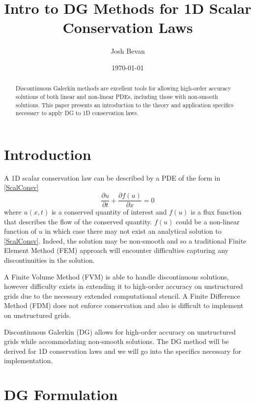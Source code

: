 \documentclass[letterpaper]{article}
\title{Intro to DG Methods for 1D Scalar Conservation Laws}
\author{Josh Bevan}
\date{\today}
\begin{document}
\maketitle
\begin{abstract}
Discontinuous Galerkin methods are excellent tools for allowing high-order accuracy solutions of both linear and non-linear PDEs, including those with non-smooth solutions. This paper presents an introduction to the theory and application specifics necessary to apply DG to 1D conservation laws.
\end{abstract}

\section{Introduction}
A 1D scalar conservation law can be described by a PDE of the form in \eqref{ScalConsv}
	\begin{equation}\label{ScalConsv}
	\frac{\partial u}{\partial t} + \frac{\partial f(u)}{\partial x} = 0
	\end{equation}
where $u(x,t)$ is a conserved quantity of interest and $f(u)$ is a flux function that describes the flow of the conserved quantity. $f(u)$ could be a non-linear function of $u$ in which case there may not exist an analytical solution to \eqref{ScalConsv}. Indeed, the solution may be non-smooth and so a traditional Finite Element Method (FEM) approach will encounter difficulties capturing any discontinuities in the solution.

A Finite Volume Method (FVM) is able to handle discontinuous solutions, however difficulty exists in extending it to high-order accuracy on unstructured grids due to the necessary extended computational stencil. A Finite Difference Method (FDM) does not enforce conservation and also is difficult to implement on unstructured grids.

Discontinuous Galerkin (DG) allows for high-order accuracy on unstructured grids while accommodating non-smooth solutions. The DG method will be derived for 1D conservation laws and we will go into the specifics necessary for implementation.

\section{DG Formulation}
\end{document}

